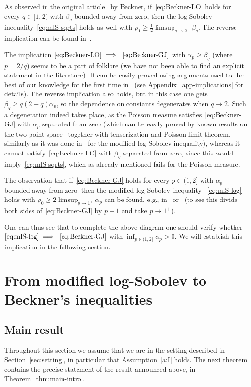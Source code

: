 \documentclass[a4paper]{amsart}
\theoremstyle{definition}
\theoremstyle{remark}
\numberwithin{equation}{section}
\begin{document}
As observed in the original article~\cite{MR954373} by Beckner, if~\eqref{eq:Beckner-LO} holds for every $q\in[1,2)$ with $\beta_q$ bounded away from zero, then the log-Sobolev inequality~\eqref{eq:mlS-sqrts} holds as well with $\rho_1 \geq \frac{1}{2}\limsup_{q\to 2^-}\beta_q$. The reverse implication can be found in~\cite{MR1796718}.

The implication $\eqref{eq:Beckner-LO} \implies~\eqref{eq:Beckner-GJ}$ with  $\alpha_p\ge \beta_q$ (where $p = 2/q$) seems to be a part of folklore (we have not been able to find an explicit statement in the literature). It can be easily proved using arguments used to the best of our knowledge for the first time in~\cite{MR1410112} (see Appendix~\ref{app-implications} for details). The reverse implication also holds, but in this case one gets $\beta_q \ge q(2-q)\alpha_p$, so the dependence on constants degenerates when $q\to 2$. Such a degeneration indeed takes place, as the Poisson measure satisfies~\eqref{eq:Beckner-GJ} with $\alpha_p$ separated from zero (which can be easily proved by known results on the two point space~\cite{MR2283379} together with tensorization and Poisson limit theorem, similarly as it was done in~\cite{MR1944012} for the modified log-Sobolev inequality), whereas it cannot satisfy~\eqref{eq:Beckner-LO} with $\beta_q$ separated from zero, since this would imply~\eqref{eq:mlS-sqrts}, which as already mentioned fails for the Poisson measure.



The observation that if~\eqref{eq:Beckner-GJ} holds for every $p\in(1,2]$ with $\alpha_p$ bounded away from zero, then the modified log-Sobolev inequality ~\eqref{eq:mlS-log} holds with $\rho_0 \geq 2\limsup_{p\to 1^+}\alpha_p$ can be found, e.g., in~\cite{MR2283379} or~\cite{MR3078024}  (to see this divide both sides of~\eqref{eq:Beckner-GJ}  by $p-1$ and take $p\to 1^+$).

One can thus see that to complete the above diagram one should verify whether $\eqref{eq:mlS-log} \implies~\eqref{eq:Beckner-GJ}$ with $\inf_{p\in (1,2]} \alpha_p > 0$. We will establish this implication in the following section.

\section{From modified log-Sobolev to Beckner's inequalities}\label{sec:mLStoBec}

\subsection{Main result}
Throughout this section we assume that we are in the setting described in Section~\ref{sec:setting}, in particular that Assumption~\ref{a:I} holds.
The next theorem contains the precise statement of the result announced above, in Theorem~\ref{thm:main-intro}.
\end{document}
